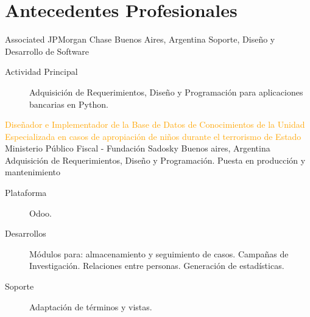 \section{Antecedentes Profesionales}

	{Associated}
	{JPMorgan Chase}
	{Buenos Aires, Argentina}
	{Soporte, Diseño y Desarrollo de Software}
	{\begin{description}
	\item [Actividad Principal] Adquisición de Requerimientos, Diseño y Programación para aplicaciones bancarias en Python.
	\end{description}}

	{\textcolor{orange}{Diseñador e Implementador de la Base de Datos de Conocimientos de la Unidad Especializada en casos de apropiación de niños durante el terrorismo de Estado}}
	{Ministerio Público Fiscal - Fundación Sadosky}
	{Buenos aires, Argentina}
	{Adquisición de Requerimientos, Diseño y Programación. Puesta en producción y mantenimiento} 
	{\begin{description}
	\item [Plataforma] Odoo.
	\item [Desarrollos] Módulos para: almacenamiento y seguimiento de casos. Campañas de Investigación. Relaciones entre personas. Generación de estadísticas.
	\item [Soporte] Adaptación de términos y vistas.
\end{description}}
	
